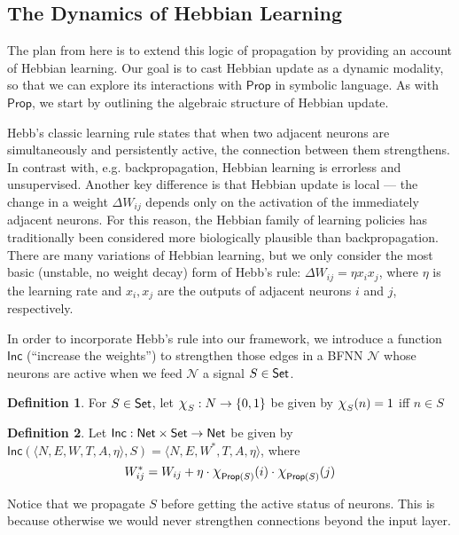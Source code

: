 \documentclass[letterpaper]{article}
\newcommand{\Set}{\mbox{\sf Set}}
\theoremstyle{definition}
\newtheorem{definition}{Definition}
\newcommand{\set}[1]{\{ #1 \}}
\newcommand{\Prop}{\textsf{Prop}}
\newcommand{\Inc}{\textsf{Inc}}
\newcommand{\AllNets}{\mathsf{Net}}
\newcommand{\Net}{\mathcal{N}}
\newcommand*{\bigchi}{\mbox{\Large$\chi$}}%
\begin{document}
\subsection{The Dynamics of Hebbian Learning}

The plan from here is to extend this logic of propagation by providing an account of Hebbian learning.  Our goal is to cast Hebbian update as a dynamic modality, so that we can explore its interactions with $\Prop$ in symbolic language.  As with $\Prop$, we start by outlining the algebraic structure of Hebbian update.

Hebb's classic learning rule \cite{hebb-organization-of-behavior-1949} states that when two adjacent neurons are simultaneously and persistently active, the connection between them strengthens.  In contrast with, e.g. backpropagation, Hebbian learning is errorless and unsupervised.  Another key difference is that Hebbian update is local --- the change in a weight $\Delta W_{ij}$ depends only on the activation of the immediately adjacent neurons.  For this reason, the Hebbian family of learning policies has traditionally been considered more biologically plausible than backpropagation.  There are many variations of Hebbian learning, but we only consider the most basic (unstable, no weight decay) form of Hebb's rule:  $\Delta W_{ij} = \eta x_i x_j$, where $\eta$ is the learning rate and $x_i, x_j$ are the outputs of adjacent neurons $i$ and $j$, respectively.

In order to incorporate Hebb's rule into our framework, we introduce a function $\Inc$ (``increase the weights'') to strengthen those edges in a BFNN $\Net$ whose neurons are active when we feed $\Net$ a signal $S \in \Set$.  
\begin{definition}
For $S \in \Set$, let 
$\bigchi_S : N \to \set{0, 1}$ be given by $\bigchi_S(n) = 1$ iff $n \in S$
\end{definition}

\begin{definition}
Let ${\Inc : \AllNets \times \Set \to \AllNets}$ be given by $\Inc(\langle N, E, W, T, A, \eta \rangle, S) = \langle N, E, W^\ast, T, A, \eta \rangle$, where
\[
    W_{ij}^\ast = W_{ij} + \eta \cdot \bigchi_{\Prop(S)}(i) \cdot  \bigchi_{\Prop(S)}(j)
\]
\end{definition}
Notice that we propagate $S$ before getting the active status of neurons.  
This is because otherwise
we would never strengthen connections beyond the input layer.
\end{document}
